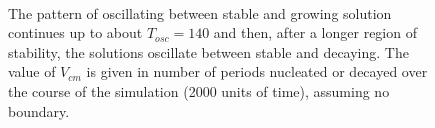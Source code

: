 \documentclass[pre,preprint,superscriptaddress]{revtex4-1}
\begin{document}
  \begin{figure}[!htb]
  \begin{center}
    \mbox{	
	\quad 
      } \mbox{
	\quad 
      }
    \caption{The pattern of oscillating between stable and growing solution continues up to about $T_{osc}=140$ and then, after a longer region of stability, the solutions oscillate between stable and decaying. The value of $V_{cm}$ is given in number of periods nucleated or decayed over the course of the simulation (2000 units of time), assuming no boundary.}
    \label{fig:r28slice3}
  \end{center}
\end{figure} 
\end{document}
